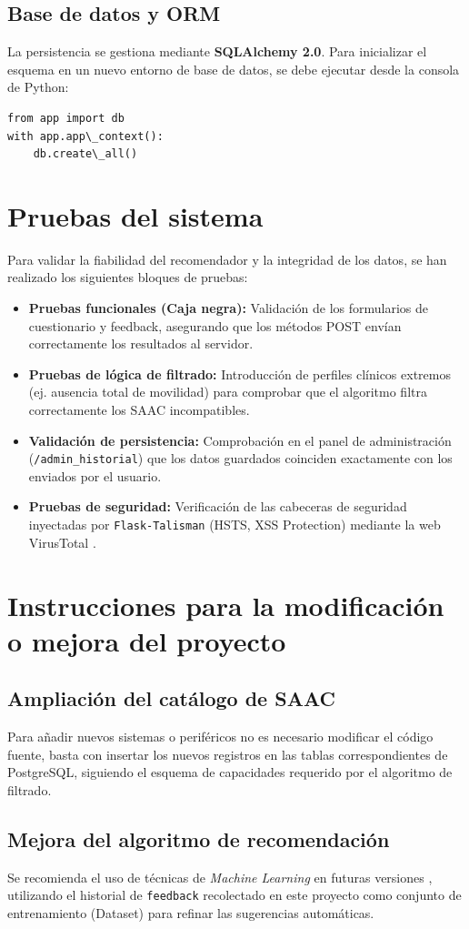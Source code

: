 \subsection{Base de datos y ORM}
La persistencia se gestiona mediante \textbf{SQLAlchemy 2.0}. Para inicializar el esquema en un nuevo entorno de base de datos, se debe ejecutar desde la consola de Python:
\begin{verbatim}
from app import db
with app.app\_context():
	db.create\_all()
\end{verbatim}

\section{Pruebas del sistema}
Para validar la fiabilidad del recomendador y la integridad de los datos, se han realizado los siguientes bloques de pruebas:

\begin{itemize}
	\item \textbf{Pruebas funcionales (Caja negra):} Validación de los formularios de cuestionario y feedback, asegurando que los métodos POST envían correctamente los resultados al servidor.
	\item \textbf{Pruebas de lógica de filtrado:} Introducción de perfiles clínicos extremos (ej. ausencia total de movilidad) para comprobar que el algoritmo filtra correctamente los SAAC incompatibles.
	\item \textbf{Validación de persistencia:} Comprobación en el panel de administración (\texttt{/admin\_historial}) que los datos guardados coinciden exactamente con los enviados por el usuario.
	\item \textbf{Pruebas de seguridad:} Verificación de las cabeceras de seguridad inyectadas por \texttt{Flask-Talisman} (HSTS, XSS Protection) mediante la web VirusTotal \cite{virustotal:upload}.
\end{itemize}

\section{Instrucciones para la modificación o mejora del proyecto}
\subsection{Ampliación del catálogo de SAAC}
Para añadir nuevos sistemas o periféricos no es necesario modificar el código fuente, basta con insertar los nuevos registros en las tablas correspondientes de PostgreSQL, siguiendo el esquema de capacidades requerido por el algoritmo de filtrado.

\subsection{Mejora del algoritmo de recomendación}
 Se recomienda el uso de técnicas de \textit{Machine Learning} en futuras versiones \cite{russell:norvig}, utilizando el historial de \texttt{feedback} recolectado en este proyecto como conjunto de entrenamiento (Dataset) para refinar las sugerencias automáticas.